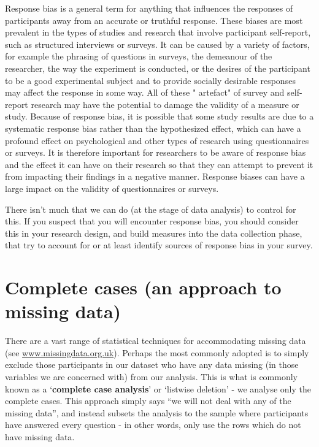 \documentclass[]{book}
\theoremstyle{definition}
\theoremstyle{definition}
\theoremstyle{definition}
\theoremstyle{remark}
\begin{document}
Response bias is a general term for anything that influences the
responses of participants away from an accurate or truthful response.
These biases are most prevalent in the types of studies and research
that involve participant self-report, such as structured interviews or
surveys. It can be caused by a variety of factors, for example the
phrasing of questions in surveys, the demeanour of the researcher, the
way the experiment is conducted, or the desires of the participant to be
a good experimental subject and to provide socially desirable responses
may affect the response in some way. All of these " artefact" of survey
and self-report research may have the potential to damage the validity
of a measure or study. Because of response bias, it is possible that
some study results are due to a systematic response bias rather than the
hypothesized effect, which can have a profound effect on psychological
and other types of research using questionnaires or surveys. It is
therefore important for researchers to be aware of response bias and the
effect it can have on their research so that they can attempt to prevent
it from impacting their findings in a negative manner. Response biases
can have a large impact on the validity of questionnaires or surveys.

There isn't much that we can do (at the stage of data analysis) to
control for this. If you suspect that you will encounter response bias,
you should consider this in your research design, and build measures
into the data collection phase, that try to account for or at least
identify sources of response bias in your survey.

\hypertarget{complete-cases-an-approach-to-missing-data}{%
\section{Complete cases (an approach to missing
data)}\label{complete-cases-an-approach-to-missing-data}}

There are a vast range of statistical techniques for accommodating
missing data (see \url{www.missingdata.org.uk}). Perhaps the most
commonly adopted is to simply exclude those participants in our dataset
who have any data missing (in those variables we are concerned with)
from our analysis. This is what is commonly known as a `\textbf{complete
case analysis}' or `listwise deletion' - we analyse only the complete
cases. This approach simply says ``we will not deal with any of the
missing data'', and instead subsets the analysis to the sample where
participants have answered every question - in other words, only use the
rows which do not have missing data.
\end{document}
